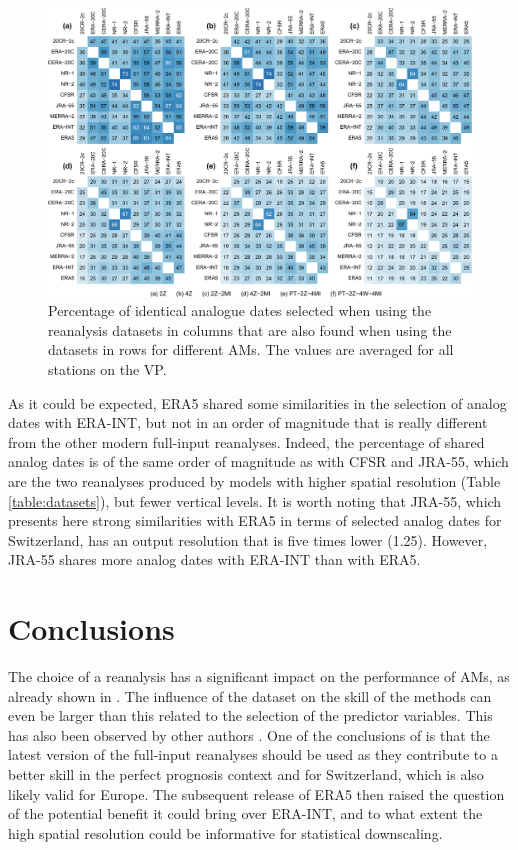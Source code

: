 \documentclass[alpha-refs]{wiley-article}
\begin{document}
\begin{figure}[bt]
	\centering
	\includegraphics[width=120mm]{figures/similar-dates.pdf}
	\caption{Percentage of identical analogue dates selected when using the reanalysis datasets in columns that are also found when using the datasets in rows for different AMs. The values are averaged for all stations on the VP.}
	\label{fig:shared-dates}
\end{figure}

As it could be expected, ERA5 shared some similarities in the selection of analog dates with ERA-INT, but not in an order of magnitude that is really different from the other modern full-input reanalyses. Indeed, the percentage of shared analog dates is of the same order of magnitude as with CFSR and JRA-55, which are the two reanalyses produced by models with higher spatial resolution (Table \ref{table:datasets}), but fewer vertical levels. It is worth noting that JRA-55, which presents here strong similarities with ERA5 in terms of selected analog dates for Switzerland, has an output resolution that is five times lower (1.25\degree). However, JRA-55 shares more analog dates with ERA-INT than with ERA5. 


\section{Conclusions}
\label{sec:conclusion}

The choice of a reanalysis has a significant impact on the performance of AMs, as already shown in \citet{Horton2018b}. The influence of the dataset on the skill of the methods can even be larger than this related to the selection of the predictor variables. This has also been observed by other authors \cite{Dayon2015}. One of the conclusions of \citet{Horton2018b} is that the latest version of the full-input reanalyses should be used as they contribute to a better skill in the perfect prognosis context and for Switzerland, which is also likely valid for Europe. The subsequent release of ERA5 then raised the question of the potential benefit it could bring over ERA-INT, and to what extent the high spatial resolution could be informative for statistical downscaling.
\end{document}

